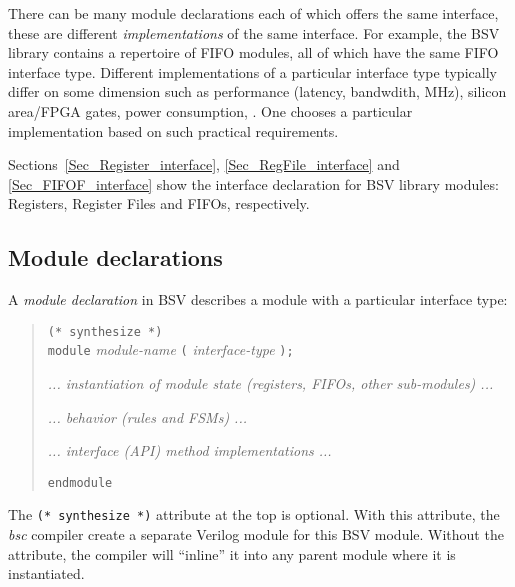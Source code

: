 There can be many module declarations each of which offers the same
interface, {\ie} these are different \emph{implementations} of the
same interface.  For example, the BSV library contains a repertoire of
FIFO modules, all of which have the same FIFO interface type.
Different implementations of a particular interface type typically
differ on some dimension such as performance (latency, bandwdith,
MHz), silicon area/FPGA gates, power consumption, {\etc}.  One chooses
a particular implementation based on such practical requirements.

Sections~\ref{Sec_Register_interface}, \ref{Sec_RegFile_interface} and
\ref{Sec_FIFOF_interface} show the interface declaration for BSV
library modules: Registers, Register Files and FIFOs, respectively.


\subsection{Module declarations}

\label{Sec_Module_Decls}


A \emph{module declaration} in BSV describes a module with a
particular interface type:

\begin{quote}
{\tt (* synthesize *)} \\
{\tt module} \emph{module-name} {\tt (} \emph{interface-type} {\tt );}

\hmm \emph{... instantiation of module state (registers, FIFOs, other sub-modules) ...}

\hmm \emph{... behavior (rules and FSMs) ...}

\hmm \emph{... interface (API) method implementations ...}

{\tt endmodule}
\end{quote}


The \verb|(* synthesize *)| attribute at the top is optional.  With
this attribute, the \emph{bsc} compiler create a separate Verilog
module for this BSV module.  Without the attribute, the compiler will
``inline'' it into any parent module where it is instantiated.

